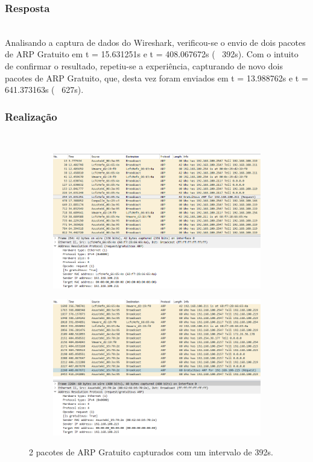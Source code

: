 \documentclass{llncs}
\begin{document}
\subsubsection{Resposta}\rule[-10pt]{0pt}{10pt}\\

Analisando a captura de dados do Wireshark, verificou-se o envio de dois pacotes de ARP Gratuito em t = 15.631251s e t = 408.067672s (~ 392s). Com o intuito de confirmar o resultado, repetiu-se a experiência, capturando de novo dois pacotes de ARP Gratuito, que, desta vez foram enviados em t = 13.988762s e t = 641.373163s (~ 627s).

\subsubsection{Realização}\rule[-10pt]{0pt}{10pt}\\

\begin{figure}[h]
  \centering
  \begin{subfigure}{.4\textwidth}
    \centering
    \includegraphics[width=0.98\linewidth]{./imagens/ARPG1_1.png}
  \end{subfigure}%
  \begin{subfigure}{.4\textwidth}
    \centering
    \includegraphics[width=0.98\linewidth]{./imagens/ARPG1_2.png}
  \end{subfigure}%
  \caption{2 pacotes de ARP Gratuito capturados com um intervalo de 392s.}
  \label{fig:arpg_1}
\end{figure}
\end{document}
